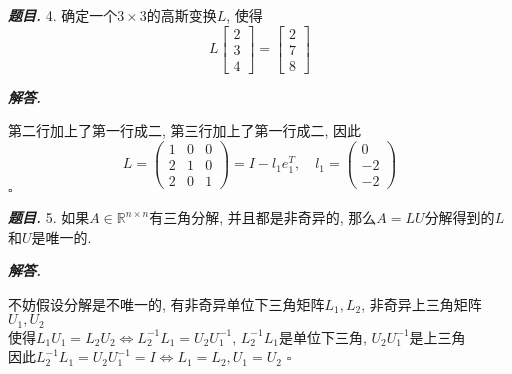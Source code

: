 \documentclass[10pt, a4paper, oneside]{ctexart}
\newenvironment{problem}{\begin{framed}\par\noindent\textbf{\textit{题目. }}}{\end{framed}\par}
\newenvironment{solution}{%
  \par\noindent\textbf{\textit{解答. }}\ignorespaces
}{%
  \hfill\ensuremath{\square}\par %
}
\begin{document}
\begin{problem}
    4. 确定一个$3\times 3$的高斯变换$L$, 使得
    $$L\begin{bmatrix}
        2\\3\\4
    \end{bmatrix}=\begin{bmatrix}
        2\\7\\8
    \end{bmatrix}$$
\end{problem}
\begin{solution}
第二行加上了第一行成二, 第三行加上了第一行成二, 因此
$$L=\begin{pmatrix}
1&0&0\\2&1&0\\2&0&1
\end{pmatrix} = I - l_1e_1^T, \quad l_1 = \begin{pmatrix}
    0\\-2\\-2
\end{pmatrix}$$
\end{solution}

\begin{problem}
    5. 如果$A\in \mathbb{R}^{n\times n}$有三角分解, 并且都是非奇异的, 那么$A=LU$分解得到的$L$和$U$是唯一的.
\end{problem}
\begin{solution}
不妨假设分解是不唯一的, 有非奇异单位下三角矩阵$L_1, L_2$, 非奇异上三角矩阵$U_1,U_2$\\
使得$L_1U_1=L_2U_2 \iff L_2^{-1}L_1=U_2U_1^{-1}$, $L_2^{-1}L_1$是单位下三角, $U_2U_1^{-1}$是上三角\\因此$L_2^{-1}L_1=U_2U_1^{-1}=I\iff L_1=L_2,U_1=U_2$
\end{solution}
\end{document}
